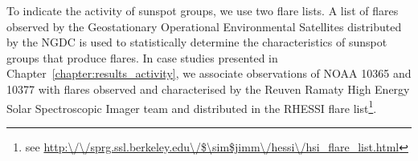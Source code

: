 To indicate the activity of sunspot groups, we use two flare lists. A list of flares observed by the Geostationary Operational Environmental Satellites \citep[GOES;][]{Hanser:1996} distributed by the \gls{NGDC} is used to statistically determine the characteristics of sunspot groups that produce flares. In case studies presented in Chapter~\ref{chapter:results_activity}, we associate observations of \gls{NOAA} 10365 and 10377 with flares observed and characterised by the Reuven Ramaty High Energy Solar Spectroscopic Imager \citep[RHESSI;][]{Lin:2002} team and distributed in the RHESSI flare list\footnote{see \url{http:\/\/sprg.ssl.berkeley.edu\/$\sim$jimm\/hessi\/hsi\_flare\_list.html}}.






